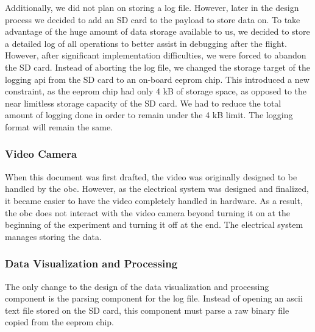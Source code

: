 Additionally, we did not plan on storing a log file.
However, later in the design process we decided to add an SD card to the
\gls{payload} to store data on.
To take advantage of the huge amount of data storage available to us, we
decided to store a detailed log of all operations to better assist in debugging
after the flight.
However, after significant implementation difficulties, we were forced to
abandon the SD card.
Instead of aborting the log file, we changed the storage target of the logging
\gls{api} from the SD card to an on-board \gls{eeprom} chip.
This introduced a new constraint, as the \gls{eeprom} chip had only 4 kB of
storage space, as opposed to the near limitless storage capacity of the SD 
card.
We had to reduce the total amount of logging done in order to remain under
the 4 kB limit.
The logging format will remain the same.

\subsubsection{Video Camera}
When this document was first drafted, the video was originally designed to be
handled by the \gls{obc}.
However, as the electrical system was designed and finalized, it became easier
to have the video completely handled in hardware.
As a result, the \gls{obc} does not interact with the video camera beyond
turning it on at the beginning of the experiment and turning it off at the end.
The electrical system manages storing the data.

\subsubsection{Data Visualization and Processing}
The only change to the design of the data visualization and processing
component is the parsing component for the log file. 
Instead of opening an \gls{ascii} text file stored on the SD card, this
component must parse a raw binary file copied from the \gls{eeprom} chip.
